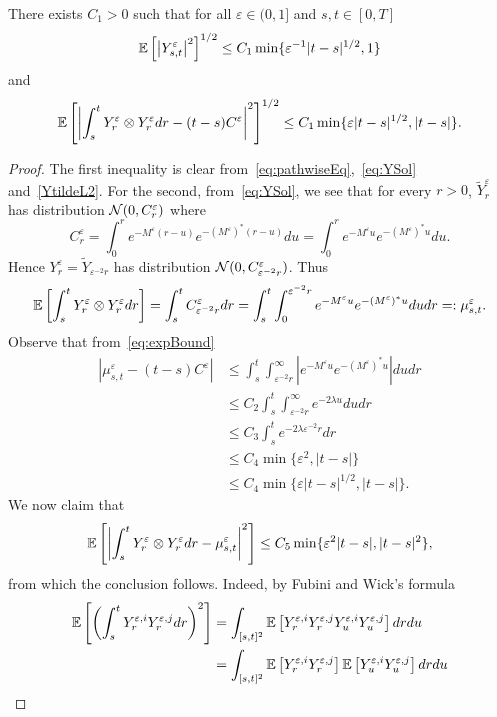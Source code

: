 \documentclass{article}
\begin{document}
\begin{lemma}\label{lem:YBounds}
There exists $C_1 > 0$ such that for all $\varepsilon \in (0,1]$ and $s,t \in [0,T]$
\[
\EEE{\left| Y^{\varepsilon}_{s,t} \right|^2}^{1/2} \leq C_1 \min\{\varepsilon^{-1}|t-s|^{1/2}, 1\}
\]
and
\[
\EEE{\left| \int_s^t Y^{\varepsilon}_r \otimes Y^{\varepsilon}_r dr - (t-s)C^\varepsilon \right|^2}^{1/2} \leq C_1 \min\{\varepsilon |t-s|^{1/2}, |t-s|\}.
\]
\end{lemma}

\begin{proof}
The first inequality is clear from~\eqref{eq:pathwiseEq},~\eqref{eq:YSol} and~\eqref{YtildeL2}. For the second, from~\eqref{eq:YSol}, we see that for every $r > 0$, $\tilde Y^{\varepsilon}_r$ has distribution $\NN(0, C^\varepsilon_r)$ where
\[
C^\varepsilon_r = \int_0^r e^{-M^\varepsilon (r-u)} e^{-(M^\varepsilon)^*(r-u)} du = \int_0^r e^{-M^\varepsilon u} e^{-(M^\varepsilon)^* u} du.
\]
Hence $Y^\varepsilon_r = \tilde Y_{\varepsilon^{-2}r}$ has distribution $\NN(0, C^\varepsilon_{\varepsilon^{-2} r})$. Thus
\[
\EEE{\int_s^t Y^{\varepsilon}_r \otimes Y^{\varepsilon}_r dr} = \int_s^t C^\varepsilon_{\varepsilon^{-2} r} dr = \int_s^t \int_0^{\varepsilon^{-2} r} e^{-M^\varepsilon u} e^{-(M^\varepsilon)^* u} du dr =: \mu_{s,t}^\varepsilon.
\]
Observe that from~\eqref{eq:expBound}
\begin{align*}
|\mu_{s,t}^\varepsilon - (t-s) C^\varepsilon| &\leq \int_s^t \int_{\varepsilon^{-2} r}^\infty |e^{-M^\varepsilon u} e^{-(M^\varepsilon)^* u}| du dr \\
&\leq C_2\int_s^t \int_{\varepsilon^{-2}r}^\infty  e^{-2\lambda u} dudr \\
&\leq C_3 \int_s^t e^{-2\lambda \varepsilon^{-2}r}dr \\
&\leq C_4 \min\{\varepsilon^2, |t-s|\} \\
&\leq C_4 \min\{\varepsilon |t-s|^{1/2}, |t-s|\}.
\end{align*}
We now claim that
\[
\EEE{\left| \int_s^t Y^{\varepsilon}_r \otimes Y^{\varepsilon}_r dr - \mu_{s,t}^\varepsilon \right|^2} \leq C_5 \min\{\varepsilon^2 |t-s|, |t-s|^2\},
\]
from which the conclusion follows. Indeed, by Fubini and Wick's formula
\begin{align*}
\EEE{\left(\int_s^t Y^{\varepsilon,i}_r Y^{\varepsilon,j}_r dr\right)^2}
&= \int_{[s,t]^2} \EEE{Y^{\varepsilon,i}_r Y^{\varepsilon,j}_r Y^{\varepsilon,i}_u Y^{\varepsilon,j}_u} dr du \\
&= \int_{[s,t]^2} \EEE{Y^{\varepsilon,i}_r Y^{\varepsilon,j}_r}\EEE{Y^{\varepsilon,i}_u Y^{\varepsilon,j}_u} dr du \\

\end{align*}
\end{proof}
\end{document}
